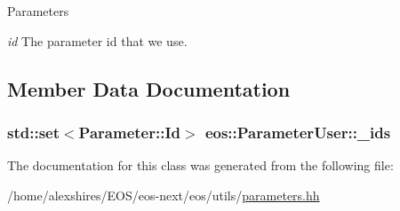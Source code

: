 \begin{DoxyParams}{Parameters}
\item[{\em id}]The parameter id that we use. \end{DoxyParams}


\subsection{Member Data Documentation}
\hypertarget{classeos_1_1ParameterUser_aa3a0285297e16cf2a5830df1f9bb2f4b}{
\subsubsection[{\_\-ids}]{\setlength{\rightskip}{0pt plus 5cm}std::set$<${\bf Parameter::Id}$>$ {\bf eos::ParameterUser::\_\-ids}}}
\label{classeos_1_1ParameterUser_aa3a0285297e16cf2a5830df1f9bb2f4b}


The documentation for this class was generated from the following file:\begin{DoxyCompactItemize}
\item 
/home/alexshires/EOS/eos-\/next/eos/utils/\hyperlink{parameters_8hh}{parameters.hh}\end{DoxyCompactItemize}
